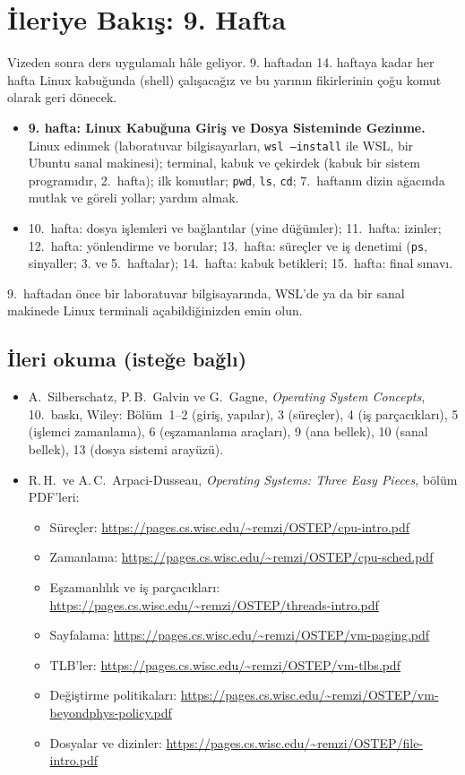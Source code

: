 \documentclass[11pt,a4paper]{article}
\newcommand{\cmd}[1]{\texttt{#1}}
\begin{document}
\section{İleriye Bakış: 9. Hafta}
Vizeden sonra ders uygulamalı hâle geliyor. 9. haftadan 14. haftaya kadar her hafta Linux kabuğunda (shell) çalışacağız ve bu yarının fikirlerinin çoğu komut olarak geri dönecek.
\begin{itemize}
  \item \textbf{9. hafta: Linux Kabuğuna Giriş ve Dosya Sisteminde Gezinme.} Linux edinmek (laboratuvar bilgisayarları, \cmd{wsl --install} ile WSL, bir Ubuntu sanal makinesi); terminal, kabuk ve çekirdek (kabuk bir sistem programıdır, 2.~hafta); ilk komutlar; \cmd{pwd}, \cmd{ls}, \cmd{cd}; 7.~haftanın dizin ağacında mutlak ve göreli yollar; yardım almak.
  \item 10.~hafta: dosya işlemleri ve bağlantılar (yine düğümler); 11.~hafta: izinler; 12.~hafta: yönlendirme ve borular; 13.~hafta: süreçler ve iş denetimi (\cmd{ps}, sinyaller; 3. ve 5.~haftalar); 14.~hafta: kabuk betikleri; 15.~hafta: final sınavı.
\end{itemize}
9.~haftadan önce bir laboratuvar bilgisayarında, WSL'de ya da bir sanal makinede Linux terminali açabildiğinizden emin olun.

\subsection*{İleri okuma (isteğe bağlı)}
\begin{itemize}
  \item A.\ Silberschatz, P.\,B.\ Galvin ve G.\ Gagne, \emph{Operating System Concepts}, 10.\ baskı, Wiley: Bölüm~1--2 (giriş, yapılar), 3 (süreçler), 4 (iş parçacıkları), 5 (işlemci zamanlama), 6 (eşzamanlama araçları), 9 (ana bellek), 10 (sanal bellek), 13 (dosya sistemi arayüzü).
  \item R.\,H.\ ve A.\,C.\ Arpaci-Dusseau, \emph{Operating Systems: Three Easy Pieces}, bölüm PDF'leri:
  \begin{itemize}[itemsep=0em]
    \item Süreçler: \url{https://pages.cs.wisc.edu/~remzi/OSTEP/cpu-intro.pdf}
    \item Zamanlama: \url{https://pages.cs.wisc.edu/~remzi/OSTEP/cpu-sched.pdf}
    \item Eşzamanlılık ve iş parçacıkları: \url{https://pages.cs.wisc.edu/~remzi/OSTEP/threads-intro.pdf}
    \item Sayfalama: \url{https://pages.cs.wisc.edu/~remzi/OSTEP/vm-paging.pdf}
    \item TLB'ler: \url{https://pages.cs.wisc.edu/~remzi/OSTEP/vm-tlbs.pdf}
    \item Değiştirme politikaları: \url{https://pages.cs.wisc.edu/~remzi/OSTEP/vm-beyondphys-policy.pdf}
    \item Dosyalar ve dizinler: \url{https://pages.cs.wisc.edu/~remzi/OSTEP/file-intro.pdf}
  \end{itemize}
\end{itemize}
\end{document}
